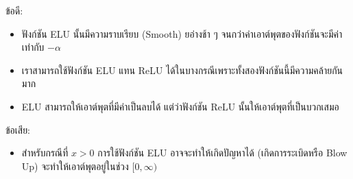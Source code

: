\noindent ข้อดี:
\begin{itemize}[topsep=0pt,noitemsep]\setlength\itemsep{0.5em}
  \item ฟังก์ชัน ELU นั้นมีความราบเรียบ (Smooth) ยอ่างช้า ๆ จนกว่าค่าเอาต์พุตของฟังก์ชันจะมีค่าเท่ากับ $-\alpha$

  \item เราสามารถใช้ฟังก์ชัน ELU แทน ReLU ได้ในบางกรณีเพราะทั้งสองฟังก์ชันนี้มีความคล้ายกันมาก

  \item ELU สามารถให้เอาต์พุตที่มีค่าเป็นลบได้ แต่ว่าฟังก์ชัน ReLU นั้นให้เอาต์พุตที่เป็นบวกเสมอ
\end{itemize}
%
ข้อเสีย:
\begin{itemize}[topsep=0pt,noitemsep]\setlength\itemsep{0.5em}
  \item สำหรับกรณีที่ $x > 0$ การใช้ฟังก์ชัน ELU อาจจะทำให้เกิดปัญหาได้ (เกิดการระเบิดหรือ Blow Up) จะทำให้เอาต์พุตอยู่ในช่วง
        $[0,\infty)$
\end{itemize}
%
